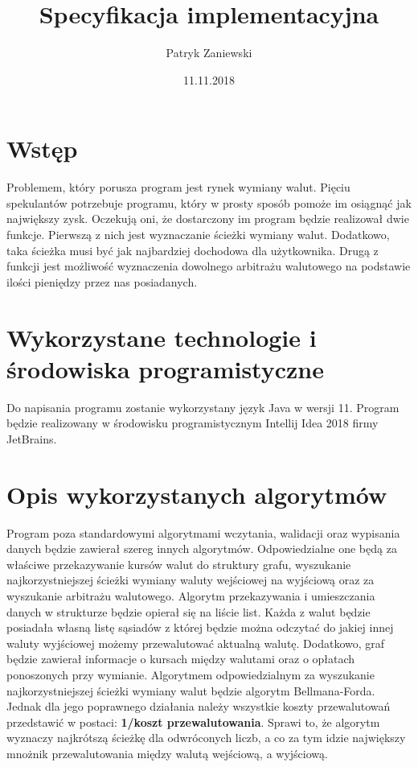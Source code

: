 ﻿\documentclass[12pt]{article}
\title{Specyfikacja implementacyjna}
\author{Patryk Zaniewski}
\date{11.11.2018}
\begin{document}
\maketitle

\tableofcontents
\newpage

\section{Wstęp}
Problemem, który porusza program jest rynek wymiany walut. Pięciu spekulantów potrzebuje programu, który w prosty sposób pomoże im osiągnąć jak największy zysk. Oczekują oni, że dostarczony im program będzie realizował dwie funkcje. Pierwszą z nich jest wyznaczanie ścieżki wymiany walut. Dodatkowo, taka ścieżka musi być jak najbardziej dochodowa dla użytkownika. Drugą z funkcji jest możliwość wyznaczenia dowolnego arbitrażu walutowego na podstawie ilości pieniędzy przez nas posiadanych.

\section{Wykorzystane technologie i środowiska programistyczne}
Do napisania programu zostanie wykorzystany język Java w wersji 11. Program będzie realizowany w środowisku programistycznym Intellij Idea 2018 firmy JetBrains.


\section{Opis wykorzystanych algorytmów}
Program poza standardowymi algorytmami wczytania, walidacji oraz wypisania danych będzie zawierał szereg innych algorytmów. Odpowiedzialne one będą za właściwe przekazywanie kursów walut do struktury grafu, wyszukanie najkorzystniejszej ścieżki wymiany waluty wejściowej na wyjściową oraz za wyszukanie arbitrażu walutowego.
\newline\newline
Algorytm przekazywania i umieszczania danych w strukturze będzie opierał się na liście list. Każda z walut będzie posiadała własną listę sąsiadów z której będzie można odczytać do jakiej innej waluty wyjściowej możemy przewalutować aktualną walutę. Dodatkowo, graf będzie zawierał informacje o kursach między walutami oraz o opłatach ponoszonych przy wymianie.
\newline\newline
Algorytmem odpowiedzialnym za wyszukanie najkorzystniejszej ścieżki wymiany walut będzie algorytm Bellmana-Forda. Jednak dla jego poprawnego działania należy wszystkie koszty przewalutowań przedstawić w postaci: \textbf{1/koszt przewalutowania}. Sprawi to, że algorytm wyznaczy najkrótszą ścieżkę dla odwróconych liczb, a co za tym idzie największy mnożnik przewalutowania między walutą wejściową, a wyjściową.
\end{document}
